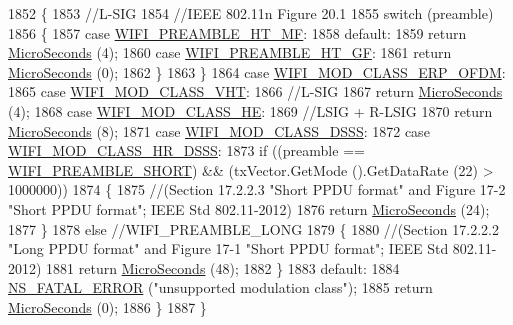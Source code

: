 \begin{DoxyCode}
1852       \{
1853         \textcolor{comment}{//L-SIG}
1854         \textcolor{comment}{//IEEE 802.11n Figure 20.1}
1855         \textcolor{keywordflow}{switch} (preamble)
1856           \{
1857           \textcolor{keywordflow}{case} \hyperlink{group__wifi_gga5e94a56cb338a14ffbbb19c6a41251ebae0944a664debb28943c12d4cd7a81d2a}{WIFI\_PREAMBLE\_HT\_MF}:
1858           \textcolor{keywordflow}{default}:
1859             \textcolor{keywordflow}{return} \hyperlink{group__timecivil_ga17465a639c8d1464e76538afdd78a9f0}{MicroSeconds} (4);
1860           \textcolor{keywordflow}{case} \hyperlink{group__wifi_gga5e94a56cb338a14ffbbb19c6a41251eba82e0b00d79c1f01b7a6e46b693bafd72}{WIFI\_PREAMBLE\_HT\_GF}:
1861             \textcolor{keywordflow}{return} \hyperlink{group__timecivil_ga17465a639c8d1464e76538afdd78a9f0}{MicroSeconds} (0);
1862           \}
1863       \}
1864     \textcolor{keywordflow}{case} \hyperlink{namespacens3_aa999e1221606a2b21b1eb33c2007c217afc1f5ef8d2c985f37a3224dd86ab014d}{WIFI\_MOD\_CLASS\_ERP\_OFDM}:
1865     \textcolor{keywordflow}{case} \hyperlink{namespacens3_aa999e1221606a2b21b1eb33c2007c217a9863e4342bf5c238c74dddfc4d96c67e}{WIFI\_MOD\_CLASS\_VHT}:
1866       \textcolor{comment}{//L-SIG}
1867       \textcolor{keywordflow}{return} \hyperlink{group__timecivil_ga17465a639c8d1464e76538afdd78a9f0}{MicroSeconds} (4);
1868     \textcolor{keywordflow}{case} \hyperlink{namespacens3_aa999e1221606a2b21b1eb33c2007c217abfa4f7272510045a9b43e8ac27ac13b0}{WIFI\_MOD\_CLASS\_HE}:
1869       \textcolor{comment}{//LSIG + R-LSIG}
1870       \textcolor{keywordflow}{return} \hyperlink{group__timecivil_ga17465a639c8d1464e76538afdd78a9f0}{MicroSeconds} (8);
1871     \textcolor{keywordflow}{case} \hyperlink{namespacens3_aa999e1221606a2b21b1eb33c2007c217aed8070e1ee089724d73fe63030cc112c}{WIFI\_MOD\_CLASS\_DSSS}:
1872     \textcolor{keywordflow}{case} \hyperlink{namespacens3_aa999e1221606a2b21b1eb33c2007c217a3c847bbae970f2de31e7b4eb7ff49840}{WIFI\_MOD\_CLASS\_HR\_DSSS}:
1873       \textcolor{keywordflow}{if} ((preamble == \hyperlink{group__wifi_gga5e94a56cb338a14ffbbb19c6a41251ebab9a39ca1f62d36c33ac489c4cf59745b}{WIFI\_PREAMBLE\_SHORT}) && (txVector.GetMode ().GetDataRate (22) > 
      1000000))
1874         \{
1875           \textcolor{comment}{//(Section 17.2.2.3 "Short PPDU format" and Figure 17-2 "Short PPDU format"; IEEE Std
       802.11-2012)}
1876           \textcolor{keywordflow}{return} \hyperlink{group__timecivil_ga17465a639c8d1464e76538afdd78a9f0}{MicroSeconds} (24);
1877         \}
1878       \textcolor{keywordflow}{else} \textcolor{comment}{//WIFI\_PREAMBLE\_LONG}
1879         \{
1880           \textcolor{comment}{//(Section 17.2.2.2 "Long PPDU format" and Figure 17-1 "Short PPDU format"; IEEE Std 802.11-2012)}
1881           \textcolor{keywordflow}{return} \hyperlink{group__timecivil_ga17465a639c8d1464e76538afdd78a9f0}{MicroSeconds} (48);
1882         \}
1883     \textcolor{keywordflow}{default}:
1884       \hyperlink{group__fatal_ga5131d5e3f75d7d4cbfd706ac456fdc85}{NS\_FATAL\_ERROR} (\textcolor{stringliteral}{"unsupported modulation class"});
1885       \textcolor{keywordflow}{return} \hyperlink{group__timecivil_ga17465a639c8d1464e76538afdd78a9f0}{MicroSeconds} (0);
1886     \}
1887 \}
\end{DoxyCode}


